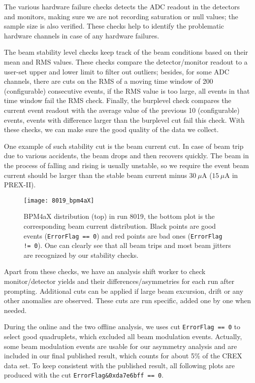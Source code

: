 The various hardware failure checks detects the ADC readout in the detectors and
monitors, making sure we are not recording saturation or null values; the 
sample size is also verified. These checks help to identify the problematic
hardware channels in case of any hardware failures.

The beam stability level checks keep track of the beam conditions based on their
mean and RMS values. These checks compare the detector/monitor readout to 
a user-set upper and lower limit to filter out outliers; besides, for some ADC 
channels, there are cuts on the RMS of a moving time window of 200 (configurable) %
consecutive events, if the RMS value is too large, 
all events in that time window fail the RMS check. 
Finally, the burplevel check compares the current event readout with the average
value of the previous 10 (configurable) events, events with difference larger than
the burplevel cut fail this check. With these checks, we can make sure the good 
quality of the data we collect.

One example of such stability cut is the beam current cut. In case of beam trip
due to various accidents, the beam drops and then recovers quickly. The beam in
the process of falling and rising is usually unstable, so we require the event
beam current should be larger than the stable beam current minus $30\ \mu$A ($15\ \mu$A in PREX-II).

\begin{figure}[!h]
    \centering
    \texttt{[image: 8019\_bpm4aX]}
    \caption{BPM4aX distribution (top) in run 8019, the bottom plot is the corresponding
    beam current distribution. Black points are good events (\texttt{ErrorFlag == 0}) 
    and red points are bad ones (\texttt{ErrorFlag != 0}). 
    One can clearly see that all beam trips and most beam jitters are recognized 
    by our stability checks.}
\end{figure}

Apart from these checks, we have an analysis shift worker to check monitor/detector 
yields and their differences/asymmetries for each run after prompting. Additional
cuts can be applied if large beam excursion, drift or any other anomalies are observed. 
These cuts are run specific, added one by one when needed.

During the online and the two offline analysis, we uses cut \verb|ErrorFlag == 0|
to select good quadruplets, which excluded all beam modulation events. Actually, 
some beam modulation events are usable for our asymmetry analysis and are
included in our final published result, which counts for about 5\% of the CREX data set.
To keep consistent with the published result, all following plots are produced with the cut 
\verb|ErrorFlag&0xda7e6bff == 0|. 

